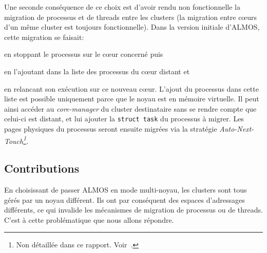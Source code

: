       Une seconde conséquence de ce choix est d'avoir rendu non fonctionnelle la
      migration de processus et de threads entre les clusters (la migration
      entre c\oe urs d'un même cluster est toujours fonctionnelle). Dans la
      version initiale d'ALMOS, cette migration se faisait:\benumline \item en
      stoppant le processus sur le c\oe ur concerné puis \item en l'ajoutant
      dans la liste des processus du c\oe ur distant et\item en relancant son
      exécution sur ce nouveau c\oe ur\eenumline. L'ajout du processus dans
      cette liste est possible uniquement parce que le noyau est en mémoire
      virtuelle. Il peut ainsi accéder au \textit{core-manager} du cluster
      destinataire sans se rendre compte que celui-ci est distant, et lui
      ajouter la \texttt{struct task} du processus à migrer. Les pages physiques
      du processus seront ensuite migrées via la stratégie
      \textit{Auto-Next-Touch\footnote{Non détaillée dans ce
          rapport. Voir~\citep{almaless2014universite}.}}.

    \subsection{Contributions}

      En choisissant de passer ALMOS en mode multi-noyau, les clusters sont tous
      gérés par un noyau différent. Ils ont par conséquent des espaces
      d'adressages différents, ce qui invalide les mécanismes de migration de
      processus ou de threads. C'est à cette problématique que nous allons
      répondre.
